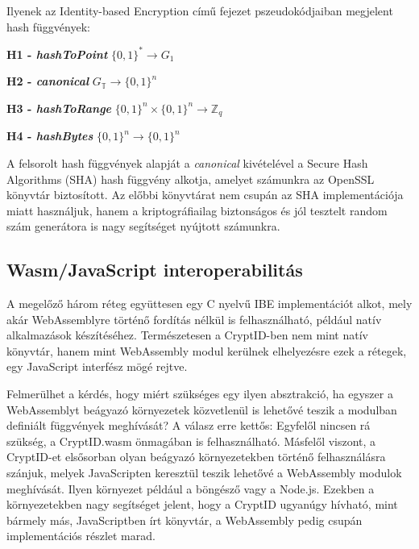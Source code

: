 Ilyenek az Identity-based Encryption című fejezet pszeudokódjaiban megjelent hash függvények:

\begin{outdentlist}
    \item[]\textbf{H1 - \textit{hashToPoint}} $\{0, 1\}^* \rightarrow G_1$
    
    \item[]\textbf{H2 - \textit{canonical}} $G_\mathbb{T} \rightarrow \{0, 1\}^n$
    
    \item[]\textbf{H3 - \textit{hashToRange}} $\{0, 1\}^n \times \{0, 1\}^n \rightarrow \mathbb{Z}_q$
    
    \item[]\textbf{H4 - \textit{hashBytes}} $\{0, 1\}^n \rightarrow \{0, 1\}^n$
\end{outdentlist}

A felsorolt hash függvények alapját a \textit{canonical} kivételével a Secure Hash Algorithms (SHA) hash függvény alkotja, amelyet számunkra az OpenSSL könyvtár biztosított. Az előbbi könyvtárat nem csupán az SHA implementációja miatt használjuk, hanem a kriptográfiailag biztonságos és jól tesztelt random szám generátora is nagy segítséget nyújtott számunkra.

\subsection{Wasm/JavaScript interoperabilitás}

A megelőző három réteg együttesen egy C nyelvű IBE implementációt alkot, mely akár WebAssemblyre történő fordítás nélkül is felhasználható, például natív alkalmazások készítéséhez. Természetesen a CryptID-ben nem mint natív könyvtár, hanem mint WebAssembly modul kerülnek elhelyezésre ezek a rétegek, egy JavaScript interfész mögé rejtve.

Felmerülhet a kérdés, hogy miért szükséges egy ilyen absztrakció, ha egyszer a WebAssemblyt beágyazó környezetek közvetlenül is lehetővé teszik a modulban definiált függvények meghívását? A válasz erre kettős: Egyfelől nincsen rá szükség, a CryptID.wasm önmagában is felhasználható. Másfelől viszont, a CryptID-et elsősorban olyan beágyazó környezetekben történő felhasználásra szánjuk, melyek JavaScripten keresztül teszik lehetővé a WebAssembly modulok meghívását. Ilyen környezet például a böngésző vagy a Node.js. Ezekben a környezetekben nagy segítséget jelent, hogy a CryptID ugyanúgy hívható, mint bármely más, JavaScriptben írt könyvtár, a WebAssembly pedig csupán implementációs részlet marad. 

